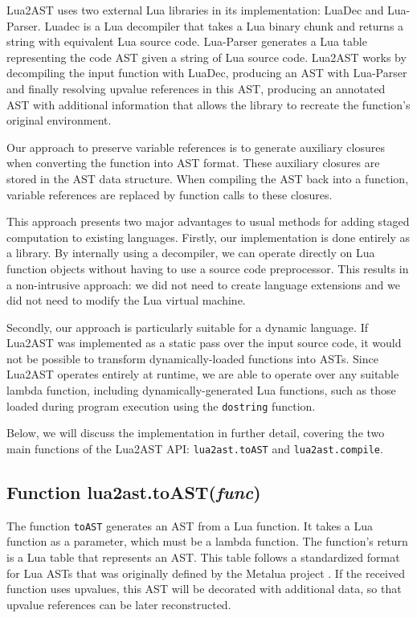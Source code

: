 \documentclass[english]{llncs}
\begin{document}
Lua2AST uses two external Lua libraries in its implementation: LuaDec and Lua-Parser.
Luadec \cite{luadec} is a Lua decompiler that takes a Lua binary chunk and returns a string with equivalent Lua source code.
Lua-Parser \cite{lua-parser} generates a Lua table representing the code AST given a string of Lua source code.
Lua2AST works by decompiling the input function with LuaDec, producing an AST with Lua-Parser
and finally resolving upvalue references in this AST, producing an annotated AST
with additional information that allows the library to recreate the function's original
environment.

Our approach to preserve variable references is to generate auxiliary closures
when converting the function into AST format. These auxiliary closures are
stored in the AST data structure. When compiling the AST back into a function,
variable references are replaced by function calls to these closures.

This approach presents two major advantages to usual methods for adding staged computation to existing languages.
Firstly, our implementation is done entirely as a library. 
By internally using a decompiler, we can operate directly on Lua function objects
without having to use a source code preprocessor.
This results in a non-intrusive approach: we did not need to create language extensions and we did not need to modify the Lua virtual machine.

Secondly, our approach is particularly suitable for a dynamic language.
If Lua2AST was implemented as a static pass over the input source code,
it would not be possible to transform dynamically-loaded functions into ASTs.
Since Lua2AST operates entirely at runtime, we are able to operate over
any suitable lambda function, including dynamically-generated Lua functions,
such as those loaded during program execution using the \texttt{dostring} function.

Below, we will discuss the implementation in further detail, covering the two main functions
of the Lua2AST API: \texttt{lua2ast.toAST} and \texttt{lua2ast.compile}.

\subsection{Function lua2ast.toAST(\emph{func})}

The function \texttt{toAST} generates an AST from a Lua function.
It takes a Lua function as a parameter, which must be a lambda function.
The function's return is a Lua table that represents an AST.
This table follows a standardized format for Lua ASTs that was originally defined by the Metalua project \cite{metalua}.
If the received function uses upvalues, this AST will be decorated with additional data, so that upvalue references
can be later reconstructed.
\end{document}
